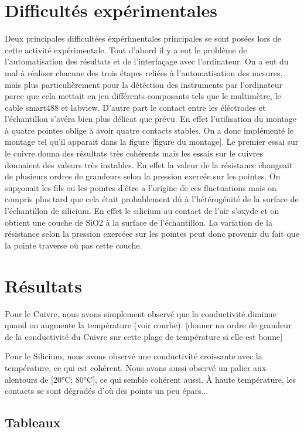 \section*{Difficultés expérimentales}
Deux principales difficultées éxpérimentales principales se sont posées lors de cette activité expérimentale. 
Tout d'abord il y a eut le problème de l'automatisation des résultats et de l'interfaçage avec l'ordinateur.
On a eut du mal à réaliser chacune des trois étapes reliées à l'automatisation des mesures, mais plus particulièrement pour la détéction des instruments par l'ordinateur parce que cela mettait en jeu différents composants tels que le multimètre, le cable smart488 et labview.
D'autre part le contact entre les éléctrodes et l'échantillon s'avéra bien plus délicat que prévu. En effet l'utilisation du montage à quatre pointes oblige à avoir quatre contacts stables. On a donc implémenté le montage tel qu'il apparait dans la figure [figure du montage]. Le premier essai sur le cuivre donna des résultats très cohérents mais les essais sur le cuivres donnaient des valeurs très instables. En effet la valeur de la résistance changeait de plusieurs ordres de grandeurs selon la pression exercée sur les pointes. On supçonait les fils ou les pointes d'être a l'origine de ces fluctuations mais on compris plus tard que cela était probablement dû à l'hétérogénité de la surface de l'échantillon de silicium. En effet le silicium au contact de l'air s'oxyde et on obtient une couche de SiO2 à la surface de l'échantillon. La variation de la résistance selon la pression exercéee sur les pointes peut donc provenir du fait que la pointe traverse où pas cette couche.


\section*{Résultats}
Pour le Cuivre, nous avons simplement observé que la conductivité diminue quand on augmente la température (voir courbe).
[donner un ordre de grandeur de la conductivité du Cuivre sur cette plage de température si elle est bonne]


Pour le Silicium, nous avons observé une conductivité croissante avec la température, ce qui est cohérent. Nous avons aussi observé un palier aux alentours de [20°C; 80°C], ce qui semble cohérent aussi.
À haute température, les contacts se sont dégradés d'où des points un peu épars...


\subsection*{Tableaux}

